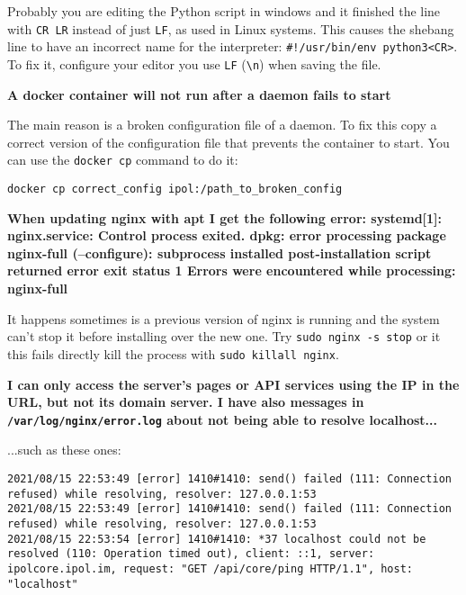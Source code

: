 \documentclass[a4paper,12pt]{article}
\begin{document}
Probably you are editing the Python script in windows and it finished the line with {\tt CR LR} instead of just {\tt LF}, as used in Linux systems. This causes the shebang line to have an incorrect name for the interpreter: {\tt \#!/usr/bin/env python3<CR>}. To fix it, configure your editor you use {\tt LF} ({\tt \textbackslash n}) when saving the file.
\vspace{0.5cm}

\textbf{A docker container will not run after a daemon fails to start}

The main reason is a broken configuration file of a daemon. To fix this copy a correct version of the configuration file that prevents the container to start. You can use the {\tt docker cp} command to do it:

\begin{verbatim}
docker cp correct_config ipol:/path_to_broken_config
\end{verbatim}

\textbf{When updating nginx with apt I get the following error: systemd[1]: nginx.service: Control process exited. dpkg: error processing package nginx-full (--configure):  subprocess installed post-installation script returned error exit status 1 Errors were encountered while processing:  nginx-full}

It happens sometimes is a previous version of nginx is running and the system can't stop it before installing over the new one. Try {\tt sudo nginx -s stop} or it this fails directly kill the process with {\tt sudo killall nginx}.
\vspace{0.5cm}

\textbf{I can only access the server's pages or API services using the IP in the URL, but not its domain server. I have also messages in {\tt /var/log/nginx/error.log} about not being able to resolve localhost...}

...such as these ones:
\begin{verbatim}
2021/08/15 22:53:49 [error] 1410#1410: send() failed (111: Connection refused) while resolving, resolver: 127.0.0.1:53
2021/08/15 22:53:49 [error] 1410#1410: send() failed (111: Connection refused) while resolving, resolver: 127.0.0.1:53
2021/08/15 22:53:54 [error] 1410#1410: *37 localhost could not be resolved (110: Operation timed out), client: ::1, server: ipolcore.ipol.im, request: "GET /api/core/ping HTTP/1.1", host: "localhost"
\end{verbatim}
\end{document}
